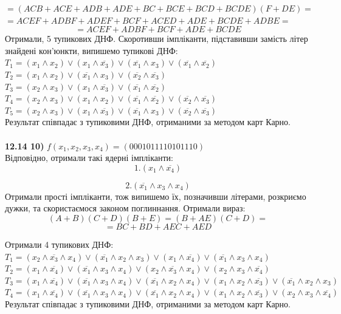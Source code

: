 \documentclass[14pt,a4paper]{scrartcl}
\theoremstyle{definition}
\theoremstyle{remark}
\theoremstyle{definition}
\theoremstyle{definition}
\begin{document}
$=(ACB + ACE + ADB + ADE + BC + BCE + BCD + BCDE)(F+ DE) =$
$
=ACEF + ADBF + ADEF + BCF + ACED + ADE + BCDE + ADBE=
$
$$
=ACEF + ADBF + BCF + ADE + BCDE
$$
 Отримали, 5 тупикових ДНФ. Скоротивши імпліканти, підставивши замість літер знайдені кон'юнкти, випишемо тупикові ДНФ:\\
 $T_1 = (x_1 \land x_2) \lor (x_1 \land \overline{x_3}) \lor (\overline{x_1} \land x_3) \lor (\overline{x_1} \land \overline{x_2}) $\\
 $T_2 = (x_1 \land x_2) \lor (\overline{x_1} \land x_3 ) \lor (\overline{x_2}\land \overline{x_3})$\\
 $T_3 = (x_2 \land x_3) \lor (x_1 \land \overline{x_3} ) \lor (\overline{x_1} \land \overline{x_2})$\\
 $T_4 = (x_2 \land x_3) \lor (x_1 \land x_2 ) \lor (\overline{x_1} \land \overline{x_2}) \lor (\overline{x_2 } \land \overline{x_3})$\\
 $T_5 = (x_2 \land x_3) \lor (x_1 \land \overline{ x_3}) \lor (\overline{x_1} \land x_3) \lor (\overline{x_2} \land \overline{x_3})$
  \\
 Результат співпадає з тупиковими ДНФ, отриманими за методом карт Карно.\\
 \\

\textbf{12.14 10)} $f(x_1, x_2, x_3, x_4) = (0001 0111 1010 1110)$\\

Відповідно, отримали такі ядерні імпліканти:
$$1. (x_1 \land \overline{x_4})  $$

$$2. (\overline{x_1} \land x_3 \land x_4)$$
Отримали прості імпліканти, тож випишемо їх, позначивши літерами, розкриємо дужки, та скористаємося законом поглиннання. Отримали вираз:
$$
(A+B)(C+D)(B+E) = (B+AE)(C+D) =
$$
$$
= BC + BD + AEC + AED
$$

Отримали 4 тупикових ДНФ:\\
$T_1 = (x_2 \land \overline{x_3} \land x_4)\lor (\overline{x_1} \land x_2 \land x_3) \lor (x_1 \land \overline{x_4}) \lor (\overline{x_1}\land x_3 \land x_4) $
\\
$T_2 = (x_1 \land \overline{x_4}) \lor (\overline{x_1}\land x_3 \land x_4) \lor (x_2 \land \overline{x_3} \land x_4) \lor (x_2 \land x_3 \land \overline{x_4}) $\\
$T_3 = (x_1 \land \overline{x_4}) \lor (\overline{x_1}\land x_3 \land x_4) \lor (\overline{x_1} \land x_2 \land x_4) \lor (x_1 \land x_2 \land \overline{x_3}) \lor (\overline{x_1} \land x_2 \land x_3)$\\
$T_4 = (x_1 \land \overline{x_4}) \lor (\overline{x_1}\land x_3 \land x_4) \lor (\overline{x_1} \land x_2 \land x_4)\lor (x_1 \land x_2 \land \overline{x_3}) \lor (x_2 \land x_3 \land \overline{x_4}) $\\
 Результат співпадає з тупиковими ДНФ, отриманими за методом карт Карно.\\
\end{document}
